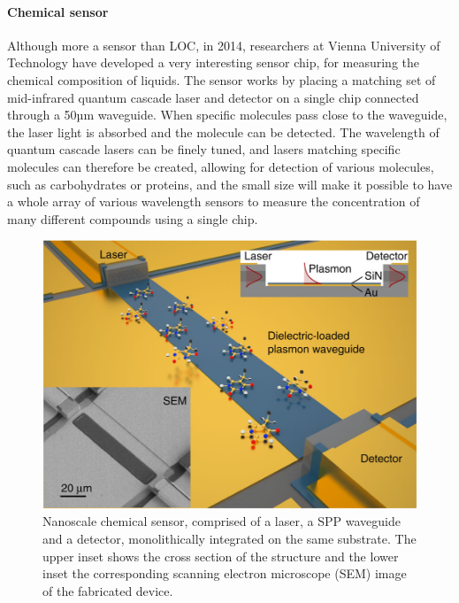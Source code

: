\paragraph{Chemical sensor \cite{Schwarz2014}}
Although more a sensor than LOC, in 2014, researchers at Vienna University of Technology have developed a very interesting sensor chip, for measuring the chemical composition of liquids. The sensor works by placing a matching set of mid-infrared quantum cascade laser and detector on a single chip connected through a 50µm waveguide. When specific molecules pass close to the waveguide, the laser light is absorbed and the molecule can be detected. The wavelength of quantum cascade lasers can be finely tuned, and lasers matching specific molecules can therefore be created, allowing for detection of various molecules, such as carbohydrates or proteins, and the small size will make it possible to have a whole array of various wavelength sensors to measure the concentration of many different compounds using a single chip.
\begin{figure}[htb]
	\centering
	\includegraphics[width=\textwidth]{figures/mlh/laserchip.jpg}
	\caption{Nanoscale chemical sensor, comprised of a laser, a SPP waveguide and a detector, monolithically integrated on the same substrate. The upper inset shows the cross section of the structure and the lower inset the corresponding scanning electron microscope (SEM) image of the fabricated device.\cite{Schwarz2014}}
	\label{fig:laserchip}
\end{figure}

